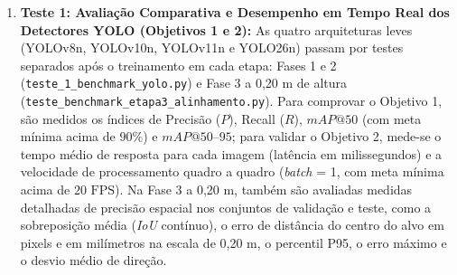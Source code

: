 \begin{enumerate}
	\item \textbf{Teste 1: Avaliação Comparativa e Desempenho em Tempo Real dos Detectores YOLO (Objetivos 1 e 2):} As quatro arquiteturas leves (YOLOv8n, YOLOv10n, YOLOv11n e YOLO26n) passam por testes separados após o treinamento em cada etapa: Fases 1 e 2 (\texttt{teste\_1\_\allowbreak benchmark\_\allowbreak yolo.py}) e Fase 3 a 0,20 m de altura (\texttt{teste\_benchmark\_\allowbreak etapa3\_\allowbreak alinhamento.py}). Para comprovar o Objetivo 1, são medidos os índices de Precisão ($P$), Recall ($R$), $mAP@50$ (com meta mínima acima de $90\%$) e $mAP@50\text{--}95$; para validar o Objetivo 2, mede-se o tempo médio de resposta para cada imagem (latência em milissegundos) e a velocidade de processamento quadro a quadro (\textit{batch} = 1, com meta mínima acima de $20\text{ FPS}$). Na Fase 3 a 0,20 m, também são avaliadas medidas detalhadas de precisão espacial nos conjuntos de validação e teste, como a sobreposição média (\textit{IoU} contínuo), o erro de distância do centro do alvo em pixels e em milímetros na escala de 0,20 m, o percentil P95, o erro máximo e o desvio médio de direção.
	

\end{enumerate}
